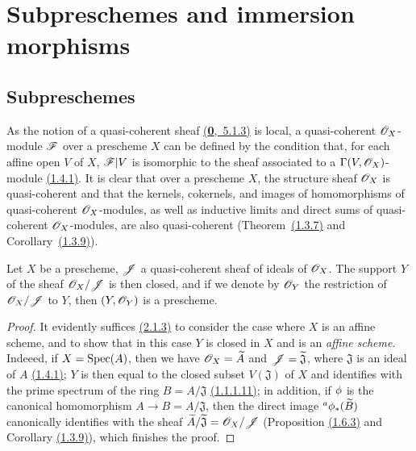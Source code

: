 \section{Subpreschemes and immersion morphisms}
\label{section-subpreschemes-and-immersion-morphisms}

\subsection{Subpreschemes}
\label{subsection-subpreschemes}

\begin{env}[4.1.1]
\label{1.4.1.1}
As the notion of a quasi-coherent sheaf \hyperref[0.5.1.3]{(\textbf{0},~5.1.3)} is local,
a quasi-coherent $\mathscr{O}_X$-module $\mathscr{F}$ over a prescheme $X$ can be defined by the condition
that, for each affine open $V$ of $X$, $\mathscr{F}|V$ is isomorphic to the sheaf associated to a
$\Gamma(V,\mathscr{O}_X)$-module \hyperref[1.1.4.1]{(1.4.1)}. It is clear that over a prescheme
$X$, the structure sheaf $\mathscr{O}_X$ is quasi-coherent and that the kernels, cokernels, and
images of homomorphisms of quasi-coherent $\mathscr{O}_X$-modules, as well as inductive limits and
direct sums of quasi-coherent $\mathscr{O}_X$-modules, are also quasi-coherent
(Theorem~\hyperref[1.1.3.7]{(1.3.7)} and Corollary~\hyperref[1.1.3.9]{(1.3.9)}).
\end{env}

\begin{prop}[4.1.2]
\label{1.4.1.2}
Let $X$ be a prescheme, $\mathscr{J}$ a quasi-coherent sheaf of ideals of $\mathscr{O}_X$. The support
$Y$ of the sheaf $\mathscr{O}_X/\mathscr{J}$ is then closed, and if we denote by $\mathscr{O}_Y$ the restriction
of $\mathscr{O}_X/\mathscr{J}$ to $Y$, then $(Y,\mathscr{O}_Y)$ is a prescheme.
\end{prop}

\begin{proof}
\label{proof-1.4.1.2}
It evidently suffices \hyperref[1.2.1.3]{(2.1.3)} to consider the case where $X$ is an
affine scheme, and to show that in this case $Y$ is closed in $X$ and is an {\em affine
scheme}. Indeeed, if $X={\mathop{\mathrm{Spec}}\nolimits}(A)$, then we have $\mathscr{O}_X=\widetilde{A}$ and
$\mathscr{J}=\widetilde{\mathfrak{J}}$, where $\mathfrak{J}$ is an ideal of $A$
\hyperref[1.1.4.1]{(1.4.1)}; $Y$ is then equal to the closed subset $V(\mathfrak{J})$ of
$X$ and identifies with the prime spectrum of the ring $B=A/\mathfrak{J}$
\hyperref[1.1.1.11]{(1.1.1.11)}; in addition, if $\phi$ is the canonical
homomorphism $A\to B=A/\mathfrak{J}$, then the direct image ${}^a\phi_*(\widetilde{B})$
canonically identifies with the sheaf $\widetilde{A}/\widetilde{\mathfrak{J}}=\mathscr{O}_X/\mathscr{J}$
(Proposition \hyperref[1.1.6.3]{(1.6.3)} and Corollary \hyperref[1.1.3.9]{(1.3.9)}),
which finishes the proof.
\end{proof}

